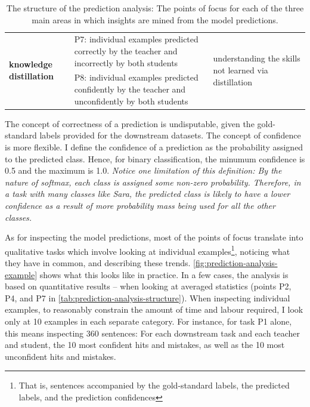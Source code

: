 \documentclass[bsc,frontabs,twoside,singlespacing,parskip,deptreport]{infthesis}
\begin{document}
{{\begin{table}[h!t]
\begin{tabular}{|m{2.5cm}|m{8.9cm}|m{3.5cm}|}
       \\ \hline
    \multirow{2}{2.5cm}{\textbf{knowledge distillation}} &
      P7: individual examples predicted correctly by the teacher and incorrectly by both students &
      \multirow{2}{3.5cm}{understanding the skills not learned via distillation} \\ \cline{2-2}
     &
      P8: individual examples predicted confidently by the teacher and unconfidently by both students &
   \\ \hline
    \end{tabular}
    \caption{The structure of the prediction analysis: The points of focus for each of the three main areas in which insights are mined from the model predictions.}
    \label{tab:prediction-analysis-structure}
    \end{table}

    The concept of correctness of a prediction is undisputable, given the gold-standard labels provided for the downstream datasets. The concept of confidence is more flexible. I define the confidence of a prediction as the probability assigned to the predicted class. Hence, for binary classification, the minumum confidence is 0.5 and the maximum is 1.0. \textit{Notice one limitation of this definition: By the nature of softmax, each class is assigned some non-zero probability. Therefore, in a task with many classes like Sara, the predicted class is likely to have a lower confidence as a result of more probability mass being used for all the other classes.}

    As for inspecting the model predictions, most of the points of focus translate into qualitative tasks which involve looking at individual examples\footnote{That is, sentences accompanied by the gold-standard labels, the predicted labels, and the prediction confidences}, noticing what they have in common, and describing these trends. \autoref{fig:prediction-analysis-example} shows what this looks like in practice.
    In a few cases, the analysis is based on quantitative results -- when looking at averaged statistics (points P2, P4, and P7 in \autoref{tab:prediction-analysis-structure}).
    When inspecting individual examples, to reasonably constrain the amount of time and labour required, I look only at 10 examples in each separate category. For instance, for task P1 alone, this means inspecting 360 sentences: For each downstream task and each teacher and student, the 10 most confident hits and mistakes, as well as the 10 most unconfident hits and mistakes.

}}
\end{document}
